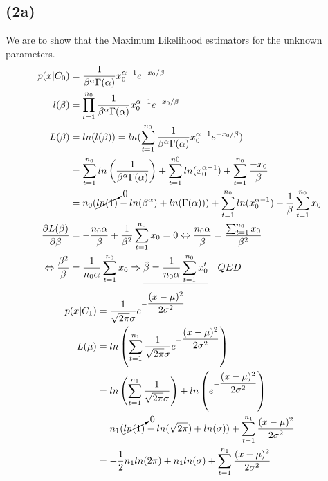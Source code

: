 \documentclass[12pt, letterpaper]{article}
\begin{document}
    \subsection*{(2a)}
      We are to show that the Maximum Likelihood estimators for the unknown parameters.
      \begin{align*}
        p(x|C_0) & = \dfrac{1}{\beta^\alpha\Gamma(\alpha)}x_{0}^{\alpha-1}e^{-x_{0}/\beta}\\
        l(\beta) & = \prod_{t=1}^{n_0} \dfrac{1}{\beta^\alpha \Gamma(\alpha)}x_{0}^{\alpha-1}e^{-x_{0}/\beta}\\
        L(\beta) & = ln(l(\beta)) = ln(\sum_{t=1}^{n_0}\dfrac{1}{\beta^\alpha \Gamma(\alpha)}x_{0}^{\alpha-1}e^{-x_{0}/\beta})\\
        & =\sum_{t=1}^{n_0}ln \left( \dfrac{1}{\beta^\alpha \Gamma(\alpha)} \right) + \sum_{t=1}^{n0}ln(x_{0}^{\alpha-1}) + \sum_{t=1}^{n_0} \dfrac{-x_0}{\beta}\\
        & = n_0( \cancelto{0}{ln(1)} - ln(\beta^\alpha) + ln(\Gamma(\alpha))) + \sum_{t=1}^{n_0} ln(x_{0}^{\alpha-1}) - \dfrac{1}{\beta}\sum_{t=1}^{n_0}x_0 \\
        \dfrac{\partial L(\beta)}{\partial\beta} & = -\dfrac{n_0 \alpha}{\beta} + \dfrac{1}{\beta^2}\sum_{t=1}^{n_0}x_0 = 0 \Leftrightarrow \dfrac{n_0 \alpha}{\beta} = \dfrac{\sum_{t=1}^{n_0}x_0}{\beta^2}\\
        \Leftrightarrow \dfrac{\beta^2}{\beta} & = \dfrac{1}{n_0 \alpha}\sum_{t=1}^{n_0}x_0 \Rightarrow \underline{\hat{\beta} = \dfrac{1}{n_0 \alpha}\sum_{t=1}^{n_0}x_0^t} \quad QED
      \end{align*}
      \begin{align*}
        p(x|C_1) & = \dfrac{1}{\sqrt{2\pi}\sigma}e^{-\dfrac{(x-\mu)^2}{2\sigma^2}} \\
        L(\mu) & = ln \left( \sum_{t=1}^{n_1} \dfrac{1}{\sqrt{2\pi}\sigma}e^{-\dfrac{(x-\mu)^2}{2\sigma^2}}\right) \\
        & = ln \left(\sum_{t=1}^{n_1} \dfrac{1}{\sqrt{2\pi}\sigma} \right) + ln\left(e^{-\dfrac{(x-\mu)^2}{2\sigma^2}} \right)\\
        & = n_1(\cancelto{0}{ln(1)}-ln(\sqrt{2\pi}) + ln(\sigma)) + \sum_{t=1}^{n_1}\dfrac{(x-\mu)^2}{2\sigma^2} \\
        & = -\dfrac{1}{2}n_1 ln(2\pi) + n_1 ln(\sigma) + \sum_{t=1}^{n_1} \dfrac{(x-\mu)^2}{2\sigma^2}
      \end{align*}
\end{document}

